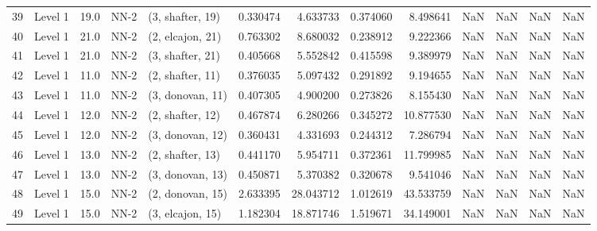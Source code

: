 \begin{tabular}{llrllrrrrrrrr}
39 &   Level 1 &   19.0 &        NN-2 &  (3, shafter, 19) &   0.330474 &   4.633733 &  0.374060 &   8.498641 &                  NaN &                    NaN &                 NaN &                   NaN \\
40 &   Level 1 &   21.0 &        NN-2 &  (2, elcajon, 21) &   0.763302 &   8.680032 &  0.238912 &   9.222366 &                  NaN &                    NaN &                 NaN &                   NaN \\
41 &   Level 1 &   21.0 &        NN-2 &  (3, shafter, 21) &   0.405668 &   5.552842 &  0.415598 &   9.389979 &                  NaN &                    NaN &                 NaN &                   NaN \\
42 &   Level 1 &   11.0 &        NN-2 &  (2, shafter, 11) &   0.376035 &   5.097432 &  0.291892 &   9.194655 &                  NaN &                    NaN &                 NaN &                   NaN \\
43 &   Level 1 &   11.0 &        NN-2 &  (3, donovan, 11) &   0.407305 &   4.900200 &  0.273826 &   8.155430 &                  NaN &                    NaN &                 NaN &                   NaN \\
44 &   Level 1 &   12.0 &        NN-2 &  (2, shafter, 12) &   0.467874 &   6.280266 &  0.345272 &  10.877530 &                  NaN &                    NaN &                 NaN &                   NaN \\
45 &   Level 1 &   12.0 &        NN-2 &  (3, donovan, 12) &   0.360431 &   4.331693 &  0.244312 &   7.286794 &                  NaN &                    NaN &                 NaN &                   NaN \\
46 &   Level 1 &   13.0 &        NN-2 &  (2, shafter, 13) &   0.441170 &   5.954711 &  0.372361 &  11.799985 &                  NaN &                    NaN &                 NaN &                   NaN \\
47 &   Level 1 &   13.0 &        NN-2 &  (3, donovan, 13) &   0.450871 &   5.370382 &  0.320678 &   9.541046 &                  NaN &                    NaN &                 NaN &                   NaN \\
48 &   Level 1 &   15.0 &        NN-2 &  (2, donovan, 15) &   2.633395 &  28.043712 &  1.012619 &  43.533759 &                  NaN &                    NaN &                 NaN &                   NaN \\
49 &   Level 1 &   15.0 &        NN-2 &  (3, elcajon, 15) &   1.182304 &  18.871746 &  1.519671 &  34.149001 &                  NaN &                    NaN &                 NaN &                   NaN \\

\end{tabular}
